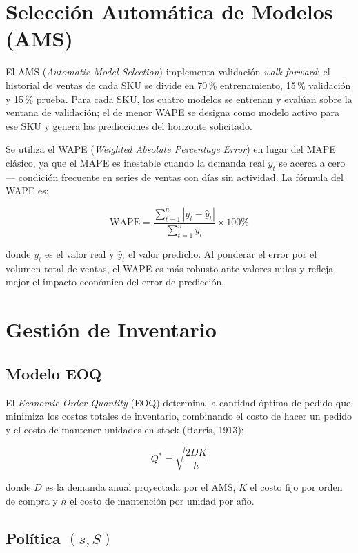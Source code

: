 \documentclass[12pt, a4paper]{report}
\begin{document}
\section{Selección Automática de Modelos (AMS)}

El AMS (\textit{Automatic Model Selection}) implementa validación \textit{walk-forward}:
el historial de ventas de cada SKU se divide en 70\,\% entrenamiento, 15\,\% validación
y 15\,\% prueba. Para cada SKU, los cuatro modelos se entrenan y evalúan sobre la
ventana de validación; el de menor WAPE se designa como modelo activo para ese SKU
y genera las predicciones del horizonte solicitado.

Se utiliza el WAPE (\textit{Weighted Absolute Percentage Error}) en lugar del MAPE
clásico, ya que el MAPE es inestable cuando la demanda real $y_t$ se acerca a cero —
condición frecuente en series de ventas con días sin actividad. La fórmula del WAPE es:

\[
  \text{WAPE} = \frac{\displaystyle\sum_{t=1}^{n} |y_t - \hat{y}_t|}
                     {\displaystyle\sum_{t=1}^{n} y_t} \times 100\%
\]

donde $y_t$ es el valor real y $\hat{y}_t$ el valor predicho. Al ponderar el error por
el volumen total de ventas, el WAPE es más robusto ante valores nulos y refleja mejor
el impacto económico del error de predicción.

\section{Gestión de Inventario}

\subsection{Modelo EOQ}

El \textit{Economic Order Quantity} (EOQ) determina la cantidad óptima de pedido que
minimiza los costos totales de inventario, combinando el costo de hacer un pedido y el
costo de mantener unidades en stock (Harris, 1913):

\[
  Q^* = \sqrt{\frac{2 D K}{h}}
\]

donde $D$ es la demanda anual proyectada por el AMS, $K$ el costo fijo por orden de
compra y $h$ el costo de mantención por unidad por año.

\subsection{Política $(s,S)$}
\end{document}
